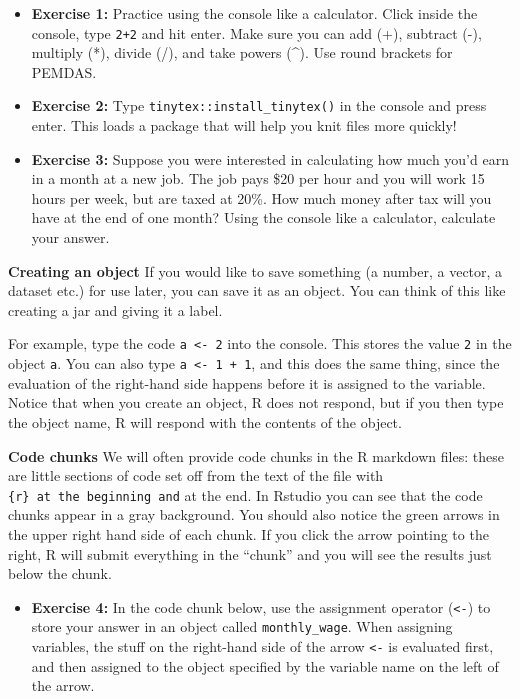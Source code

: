 \documentclass[
]{article}
\providecommand{\tightlist}{%
  \setlength{\itemsep}{0pt}\setlength{\parskip}{0pt}}
\begin{document}
\begin{itemize}
\tightlist
\item
  \textbf{Exercise 1:} Practice using the console like a calculator.
  Click inside the console, type \texttt{2+2} and hit enter. Make sure
  you can add (+), subtract (-), multiply (*), divide (/), and take
  powers (\^{}). Use round brackets for PEMDAS.
\item
  \textbf{Exercise 2:} Type \texttt{tinytex::install\_tinytex()} in the
  console and press enter. This loads a package that will help you knit
  files more quickly!
\item
  \textbf{Exercise 3:} Suppose you were interested in calculating how
  much you'd earn in a month at a new job. The job pays \$20 per hour
  and you will work 15 hours per week, but are taxed at 20\%. How much
  money after tax will you have at the end of one month? Using the
  console like a calculator, calculate your answer.
\end{itemize}

\textbf{Creating an object} If you would like to save something (a
number, a vector, a dataset etc.) for use later, you can save it as an
object. You can think of this like creating a jar and giving it a label.

For example, type the code \texttt{a\ \textless{}-\ 2} into the console.
This stores the value \texttt{2} in the object \texttt{a}. You can also
type \texttt{a\ \textless{}-\ 1\ +\ 1}, and this does the same thing,
since the evaluation of the right-hand side happens before it is
assigned to the variable. Notice that when you create an object, R does
not respond, but if you then type the object name, R will respond with
the contents of the object.

\textbf{Code chunks} We will often provide code chunks in the R markdown
files: these are little sections of code set off from the text of the
file with \texttt{\{r\}\ at\ the\ beginning\ and} at the end. In Rstudio
you can see that the code chunks appear in a gray background. You should
also notice the green arrows in the upper right hand side of each chunk.
If you click the arrow pointing to the right, R will submit everything
in the ``chunk'' and you will see the results just below the chunk.

\begin{itemize}
\tightlist
\item
  \textbf{Exercise 4:} In the code chunk below, use the assignment
  operator (\texttt{\textless{}-}) to store your answer in an object
  called \texttt{monthly\_wage}. When assigning variables, the stuff on
  the right-hand side of the arrow \texttt{\textless{}-} is evaluated
  first, and then assigned to the object specified by the variable name
  on the left of the arrow.
\end{itemize}
\end{document}
